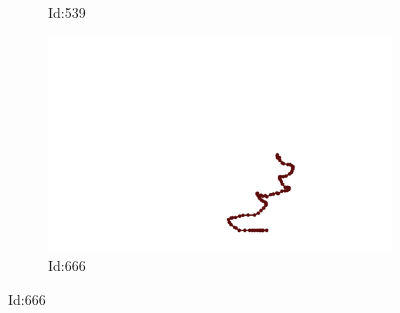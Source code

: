 \documentclass[12pt,twoside]{report}
\begin{document}
\begin{figure}
\begin{subfigure}[b]{0.20\textwidth}
\caption{Id:539}
\end{subfigure}
\begin{subfigure}[b]{0.20\textwidth}
\centering
\includegraphics[width=\textwidth]{../../trajectories/666.png}
\caption{Id:666}
\end{subfigure}
\end{figure}
\end{document}
